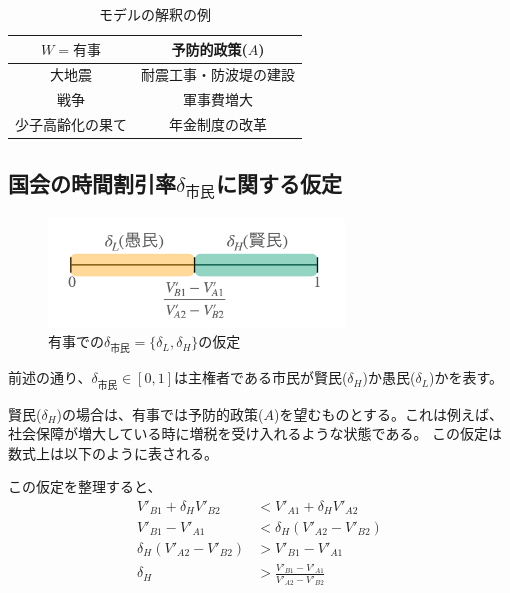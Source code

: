 \documentclass[main.tex]{subfiles}
\begin{document}
\begin{table}[htbp]
  \caption{モデルの解釈の例}
  \label{table:data_type}
  \centering
  \begin{tabular}{cc}
    \toprule
    $W=有事$ & 予防的政策($A$) \\
    \midrule
    大地震 & 耐震工事・防波堤の建設 \\
    戦争 & 軍事費増大 \\
    少子高齢化の果て & 年金制度の改革 \\
    \bottomrule
  \end{tabular}
\end{table}



\subsection{国会の時間割引率$\delta_{市民}$に関する仮定}

\begin{figure}[htbp]
  \centering
  \includegraphics[width=0.7\textwidth]{./image/assumption_citizen_discount_rate.png}
  \caption{有事での$\delta_{市民}=\lbrace \delta_L, \delta_H \rbrace$の仮定} 
  \label{fig:assumption_citizen_discount_rate}
\end{figure}


前述の通り、$\delta_{市民}\in[0,1]$は主権者である市民が賢民($\delta_H$)か愚民($\delta_L$)かを表す。

賢民($\delta_H$)の場合は、有事では予防的政策($A$)を望むものとする。これは例えば、社会保障が増大している時に増税を受け入れるような状態である。
この仮定は数式上は以下のように表される。

この仮定を整理すると、
\begin{align*}
  V'_{B1} + \delta_H V'_{B2} &< V'_{A1} + \delta_H V'_{A2}\\
  V'_{B1}-V'_{A1}  &<  \delta_H (V'_{A2} - V'_{B2}) \\
  \delta_H (V'_{A2} - V'_{B2}) &> V'_{B1}-V'_{A1} \\
  \delta_H &> \frac{V'_{B1}-V'_{A1}}{V'_{A2} - V'_{B2}}
\end{align*}
\end{document}
